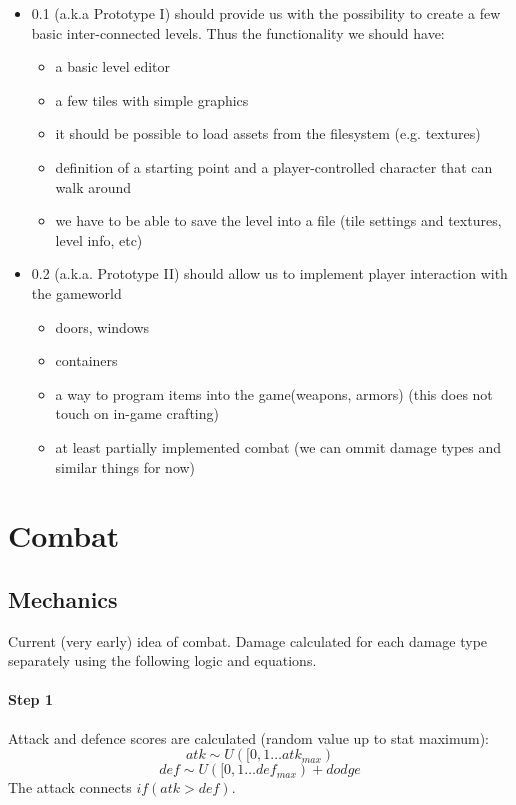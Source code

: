 \documentclass[a4paper,10pt]{book}
\begin{document}
\begin{itemize}
  \item \Enginename{} 0.1 (a.k.a Prototype I) should provide us with the possibility to create a few basic inter-connected levels. Thus the functionality we should have:
  \begin{itemize}
    \item a basic level editor
    \item a few tiles with simple graphics
    \item it should be possible to load assets from the filesystem (e.g. textures)
    \item definition of a starting point and a player-controlled character that can walk around
    \item we have to be able to save the level into a file (tile settings and textures, level info, etc)
  \end{itemize}
  \item \Enginename{} 0.2 (a.k.a. Prototype II) should allow us to implement player interaction with the gameworld
  \begin{itemize}
    \item doors, windows
    \item containers
    \item a way to program items into the game(weapons, armors) (this does not touch on in-game crafting)
    \item at least partially implemented combat (we can ommit damage types and
      similar things for now)
  \end{itemize}
\end{itemize}

\chapter{Combat}

\section{Mechanics}
Current (very early) idea of combat. Damage calculated for each damage type
separately using the following logic and equations.

\subsubsection*{Step 1}
Attack and defence scores are calculated (random value up to stat maximum):
\begin{equation*} atk \sim U([0,1 \dots atk_{max}) \end{equation*}
\begin{equation*} def \sim U([0,1 \dots def_{max}) + dodge\end{equation*}
The attack connects \begin{math} if(atk > def) \end{math}. 
\end{document}
